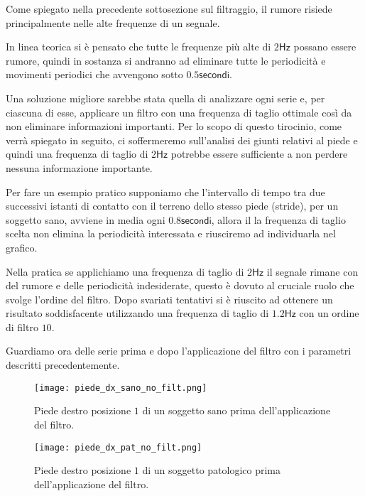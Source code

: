 Come spiegato nella precedente sottosezione sul filtraggio, il rumore risiede principalmente nelle
alte frequenze di un segnale.

In linea teorica si è pensato che tutte le frequenze più alte di $2\mathsf{Hz}$ possano essere rumore,
quindi in sostanza si andranno ad eliminare tutte le periodicità e movimenti periodici 
che avvengono sotto $0.5 \mathsf{secondi}$. 

Una soluzione migliore sarebbe stata quella di analizzare
ogni serie e, per ciascuna di esse, applicare un filtro con una frequenza di taglio ottimale così da
non eliminare informazioni importanti. Per lo scopo di questo tirocinio, come verrà spiegato in seguito,
ci soffermeremo sull'analisi dei giunti relativi al piede e quindi una frequenza di taglio di $2\mathsf{Hz}$
potrebbe essere sufficiente a non perdere nessuna informazione importante.


Per fare un esempio pratico supponiamo che l'intervallo di tempo tra due successivi istanti di contatto con il
terreno dello stesso piede (stride), per un soggetto sano, avviene in media ogni $0.8\mathsf{secondi}$,
allora il la frequenza di taglio scelta non elimina la periodicità interessata e riusciremo 
ad individuarla nel grafico.

Nella pratica se applichiamo una frequenza di taglio di $2\mathsf{Hz}$ il segnale rimane con del rumore
e delle periodicità indesiderate, questo è dovuto al cruciale ruolo che svolge l'ordine del filtro.
Dopo svariati tentativi si è riuscito ad ottenere un risultato soddisfacente utilizzando una frequenza
di taglio di $1.2\mathsf{Hz}$ con un ordine di filtro $10$.

Guardiamo ora delle serie prima e dopo l'applicazione del filtro con i parametri descritti
precedentemente.


\begin{figure}[H]
    \centering
    \texttt{[image: piede\_dx\_sano\_no\_filt.png]}
    \caption{Piede destro posizione $1$ di un soggetto sano prima dell'applicazione del filtro.}
    \label{fig:piede_dx_1_sano_no_filt}
\end{figure}

\begin{figure}[H]
    \centering
    \texttt{[image: piede\_dx\_pat\_no\_filt.png]}
    \caption{Piede destro posizione $1$ di un soggetto patologico prima dell'applicazione del filtro.}
    \label{fig:piede_dx_1_pat_no_filt}
\end{figure}

